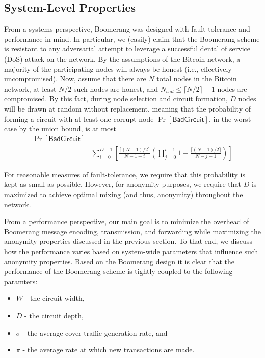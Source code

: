 \subsection{System-Level Properties}
From a systems perspective, Boomerang was designed with fault-tolerance and performance in mind. In particular, we (easily) claim that the Boomerang scheme is resistant to any adversarial attempt to leverage a successful denial of service (DoS) attack on the network. By the assumptions of the Bitcoin network, a majority of the participating nodes will always be honest (i.e., effectively uncompromised). Now, assume that there are $N$ total nodes in the Bitcoin network, at least $N/2$ such nodes are honest, and $N_{bad} \leq \lceil N/2 \rceil - 1$ nodes are compromised. By this fact, during node selection and circuit formation, $D$ nodes will be drawn at random without replacement, meaning that the probability of forming a circuit with at least one corrupt node $\Pr[\mathsf{BadCircuit}]$, in the worst case by the union bound, is at most
\begin{align*}
\Pr[\mathsf{BadCircuit}] & = \\
& \sum_{i=0}^{D-1} \left[ \frac{\lceil (N-1)/2 \rceil}{N - 1 - i}\left( \prod_{j=0}^{i-1} 1 - \frac{ \lceil (N-1)/2 \rceil}{N-j-1} \right) \right]
\end{align*}


For reasonable measures of fault-tolerance, we require that this probability is kept as small as possible. However, for anonymity purposes, we require that $D$ is maximized to achieve optimal mixing (and thus, anonymity) throughout the network. 


From a performance perspective, our main goal is to minimize the overhead of Boomerang message encoding, transmission, and forwarding while maximizing the anonymity properties discussed in the previous section. To that end, we discuss how the performance varies based on system-wide parameters that influence such anonymity properties. Based on the Boomerang design it is clear that the performance of the Boomerang scheme is tightly coupled to the following paramters:
\begin{itemize}
	\item $W$ - the circuit width,
	\item $D$ - the circuit depth,
	\item $\sigma$ - the average cover traffic generation rate, and
	\item $\pi$ - the average rate at which new transactions are made.
\end{itemize}

